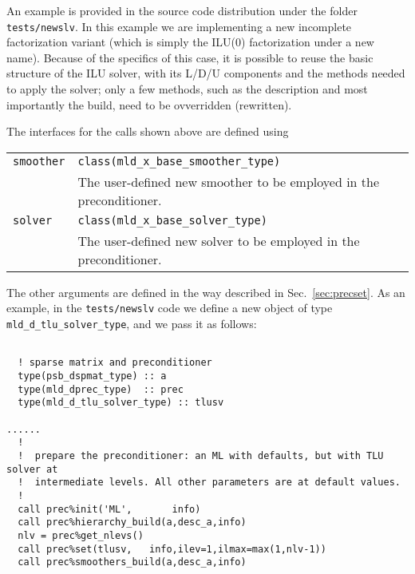 An example is provided in the source code distribution under the
folder \verb|tests/newslv|. In this example we are implementing a new
incomplete factorization variant (which is simply the ILU(0)
factorization under a new name). Because of the specifics of  this case, it is
possible to reuse the basic structure of the ILU solver, with its
L/D/U components and the methods needed to apply the solver; only a
few methods, such as the description and most importantly the build,
need to be ovverridden (rewritten). 

The interfaces for the calls shown above are defined using
\begin{center}
\begin{tabular}{p{1.4cm}p{12cm}}
\verb|smoother| & \verb|class(mld_x_base_smoother_type)| \\
              & The user-defined new smoother to be employed in the
                preconditioner.\\
\verb|solver| & \verb|class(mld_x_base_solver_type)| \\
              & The user-defined new solver to be employed in the
                preconditioner.
\end{tabular}
\end{center}
The other arguments are defined in the way described in
Sec.~\ref{sec:precset}.  As an example, in  the \verb|tests/newslv|
code we define a new object of type \verb|mld_d_tlu_solver_type|, and
we pass it as follows:
\begin{verbatim}

  ! sparse matrix and preconditioner
  type(psb_dspmat_type) :: a
  type(mld_dprec_type)  :: prec
  type(mld_d_tlu_solver_type) :: tlusv

......
  !
  !  prepare the preconditioner: an ML with defaults, but with TLU solver at
  !  intermediate levels. All other parameters are at default values. 
  !  
  call prec%init('ML',       info)
  call prec%hierarchy_build(a,desc_a,info)
  nlv = prec%get_nlevs()
  call prec%set(tlusv,   info,ilev=1,ilmax=max(1,nlv-1))
  call prec%smoothers_build(a,desc_a,info)

\end{verbatim}
